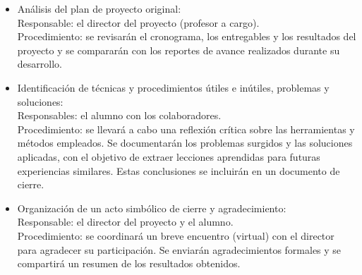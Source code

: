 \documentclass[
11pt, %
]{charter}
\begin{document}
\begin{itemize}
    \item Análisis del plan de proyecto original: \\
     Responsable: el director del proyecto (profesor a cargo). \\
     Procedimiento: se revisarán el cronograma, los entregables y los resultados del proyecto y se compararán con los reportes de avance realizados durante su desarrollo.

    \item Identificación de técnicas y procedimientos útiles e inútiles, problemas y soluciones: \\
     Responsables: el alumno con los  colaboradores. \\
     Procedimiento: se llevará a cabo una reflexión crítica sobre las herramientas y métodos empleados. Se documentarán los problemas surgidos y las soluciones aplicadas, con el objetivo de extraer lecciones aprendidas para futuras experiencias similares. Estas conclusiones se incluirán en un documento de cierre.

    \item Organización de un acto simbólico de cierre y agradecimiento: \\
    Responsable: el director del proyecto y el alumno. \\
    Procedimiento: se coordinará un breve encuentro (virtual) con el director para agradecer su participación. Se enviarán agradecimientos formales y se compartirá un resumen de los resultados obtenidos.
\end{itemize}
\end{document}
